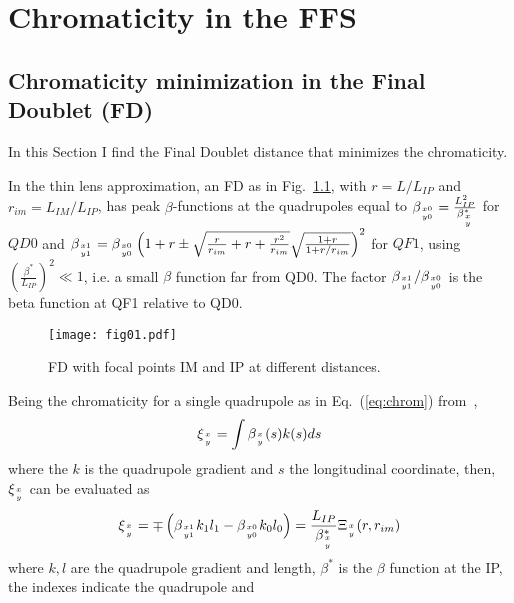 \chapter{Chromaticity in the FFS}\label{s:FFS}
\section{Chromaticity minimization in the Final Doublet (FD)}
In this Section I find the Final Doublet distance that minimizes the chromaticity.\par 
In the thin lens approximation, an FD as in Fig.~\ref{f:FDchrom}, with $r=L/L_{IP}$ and $r_{im}=L_{IM}/L_{IP}$, has peak $\beta$-functions at the quadrupoles equal to $\beta_{x0\atop y0}=\frac{L^2_{IP}}{\beta^*_{x\atop y}}$  for $QD0$ and $
\beta_{x1\atop y1}=\beta_{x0\atop y0}\left(1+r\pm\sqrt{\frac{r}{r_{im}}+r+\frac{r^2}{r_{im}}}\sqrt{\frac{1+r}{1+r/r_{im}}}\right)^2
$ for $QF1$, using $\left(\frac{\beta^*}{L_{IP}}\right)^2\ll1$, i.e. a small $\beta$ function far from QD0. The factor $\beta_{x1\atop y1}/\beta_{x0\atop y0}$ is the beta function at QF1 relative to QD0.\par
\begin{figure}[!htb]
 \centering
 \texttt{[image: fig01.pdf]}\caption{FD with focal points IM and IP at different distances.}\label{f:FDchrom}
 \end{figure}
Being the chromaticity for a single quadrupole as in Eq.~(\ref{eq:chrom}) from~\cite{GarciaMorales:1982827}, 
\begin{equation}
\xi_{x\atop y}=\int\beta_{x\atop y}(s)k(s)ds\label{eq:chrom}
\end{equation}
where the $k$ is the quadrupole gradient and $s$ the longitudinal coordinate, then, $\xi_{x\atop y}$ can be evaluated as
\begin{equation}
 \xi_{x\atop y}=\mp\left(\beta_{x1\atop y1}k_1l_1-\beta_{x0\atop y0}k_0l_0\right)=\frac{L_{IP}}{\beta^*_{x\atop y}}\Xi_{x\atop y}(r,r_{im})
\end{equation}
where $k,l$ are the quadrupole gradient and length, $\beta^*$ is the $\beta$ function at the IP, the indexes indicate the quadrupole and 

